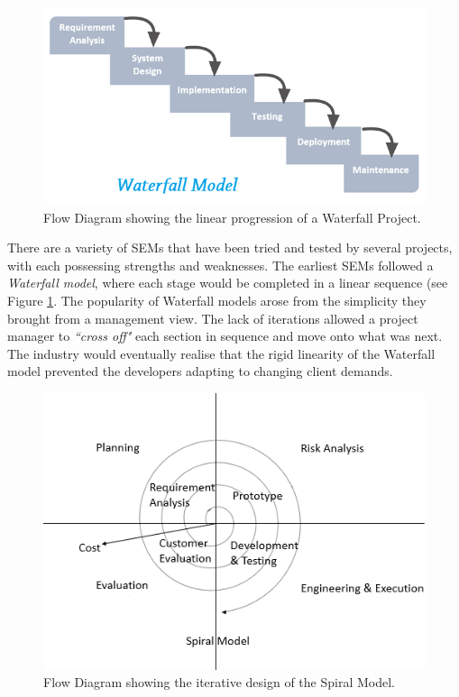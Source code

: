 \documentclass[final]{cmpreport}
\begin{document}
			\begin{figure}[h]
				\centering
				\includegraphics[width=0.8\linewidth]{waterfall.png}
				\caption[Waterfall Flow Diagram]{Flow Diagram showing the linear progression of a Waterfall Project.} \label{fig:waterfall}
			\end{figure}
			
			There are a variety of SEMs that have been tried and tested by several projects, with each possessing strengths and weaknesses. The earliest SEMs followed a \emph{Waterfall model}, where each stage would be completed in a linear sequence (see Figure \ref{fig:waterfall}. The popularity of Waterfall models arose from the simplicity they brought from a management view. The lack of iterations allowed a project manager to \emph{``cross off"} each section in sequence and move onto what was next. The industry would eventually realise that the rigid linearity of the Waterfall model prevented the developers adapting to changing client demands. 
			
			\begin{figure}
				\centering
				\includegraphics[width=0.8\linewidth]{spiral.png}
				\caption[Spiral Model Flow Diagram]{Flow Diagram showing the iterative design of the Spiral Model.} \label{fig:spiral}
			\end{figure}
			
\end{document}
